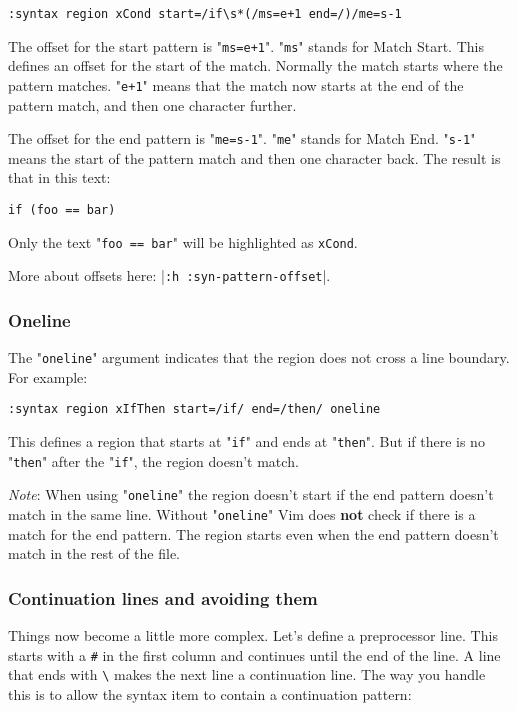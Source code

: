 \begin{Verbatim}[samepage=true]
 :syntax region xCond start=/if\s*(/ms=e+1 end=/)/me=s-1
\end{Verbatim}

The offset for the start pattern is "\verb!ms=e+1!".
"\verb!ms!" stands for Match Start.
This defines an offset for the start of the match.
Normally the match starts where the pattern matches.
"\verb!e+1!" means that the match now starts at the end of the pattern match, and then one character further.

The offset for the end pattern is "\verb!me=s-1!".
"\verb!me!" stands for Match End.
"\verb!s-1!" means the start of the pattern match and then one character back.
The result is that in this text:

\begin{Verbatim}[samepage=true]
    if (foo == bar) 
\end{Verbatim}

Only the text "\verb!foo == bar!" will be highlighted as \verb!xCond!.

More about offsets here: |\verb!:h :syn-pattern-offset!|.
\subsubsection{Oneline}
The "\verb!oneline!" argument indicates that the region does not cross a line boundary.
For example:

\begin{Verbatim}[samepage=true]
 :syntax region xIfThen start=/if/ end=/then/ oneline
\end{Verbatim}

This defines a region that starts at "\verb!if!" and ends at "\verb!then!".
But if there is no "\verb!then!" after the "\verb!if!", the region doesn't match.

\emph{Note}: When using "\verb!oneline!" the region doesn't start if the end pattern doesn't match in the same line.
Without "\verb!oneline!" Vim does \textbf{not} check if there is a match for the end pattern.
The region starts even when the end pattern doesn't match in the rest of the file.

\subsubsection{Continuation lines and avoiding them}
Things now become a little more complex.
Let's define a preprocessor line.
This starts with a \verb!#! in the first column and continues until the end of the line.
A line that ends with \verb!\! makes the next line a continuation line.
The way you handle this is to allow the syntax item to contain a continuation pattern:

